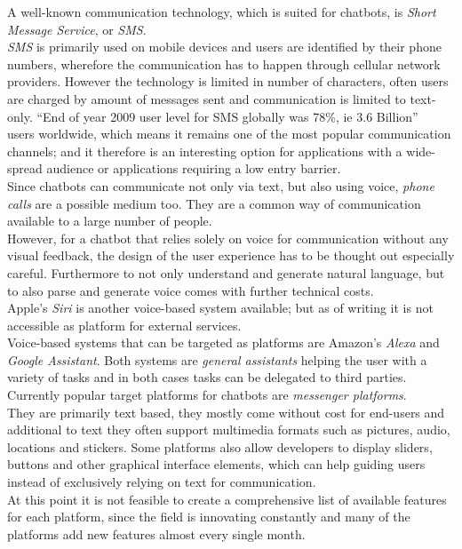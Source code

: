 A well-known communication technology, which is suited for chatbots, is \emph{Short Message Service}, or \emph{SMS}.
\\
\emph{SMS} is primarily used on mobile devices and users are identified by their phone numbers,
wherefore the communication has to happen through cellular network providers.
However the technology is limited in number of characters, often users are charged by amount of messages sent and communication is limited to text-only.
``End of year 2009 user level for SMS globally was 78\%, ie 3.6 Billion''~\cite{mobilenumbers} users worldwide,
which means it remains one of the most popular communication channels;
and it therefore is an interesting option for applications with a wide-spread audience or applications requiring a low entry barrier.
\\

Since chatbots can communicate not only via text, but also using voice, \emph{phone calls} are a possible medium too.
They are a common way of communication available to a large number of people.
\\
However, for a chatbot that relies solely on voice for communication without any visual feedback, the design of the user experience has to be thought out especially careful.
Furthermore to not only understand and generate natural language,
but to also parse and generate voice comes with further technical costs.
\\

Apple's \emph{Siri} is another voice-based system available; but as of writing it is not accessible as platform for external services.
\\
Voice-based systems that can be targeted as platforms are Amazon's \emph{Alexa} and \emph{Google Assistant}.
Both systems are \emph{general assistants} helping the user with a variety of tasks
and in both cases tasks can be delegated to third parties.
\\

Currently popular target platforms for chatbots are \emph{messenger platforms}.
\\
They are primarily text based, they mostly come without cost for end-users and additional to text they often support multimedia formats such as pictures, audio, locations and stickers.
Some platforms also allow developers to display sliders, buttons and other graphical interface elements, which can help guiding users instead of exclusively relying on text for communication.
\\
At this point it is not feasible to create a comprehensive list of available features for each platform, since the field is innovating constantly and many of the platforms add new features almost every single month.
\\

